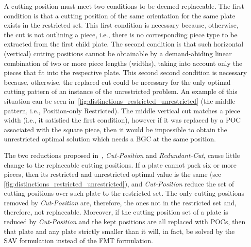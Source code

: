 \documentclass[ppgc,tese,english,formais,babel]{iiufrgs}
\begin{document}
A cutting position must meet two conditions to be deemed replaceable.
The first condition is that a cutting position of the same orientation for the same plate exists in the restricted set.
This first condition is necessary because, otherwise, the cut is not outlining a piece, i.e., there is no corresponding piece type to be extracted from the first child plate.
The second condition is that such horizontal (vertical) cutting positions cannot be obtainable by a demand-abiding linear combination of two or more piece lengths (widths), taking into account only the pieces that fit into the respective plate.
This second second condition is necessary because, otherwise, the replaced cut could be necessary for the only optimal cutting pattern of an instance of the unrestricted problem.
An example of this situation can be seen in~\cref{fig:distinctions_restricted_unrestricted} (the middle pattern, i.e., Position-only Restricted).
The middle vertical cut matches a piece width (i.e., it satisfied the first condition), however if it was replaced by a POC associated with the square piece, then it would be impossible to obtain the unrestricted optimal solution which needs a BGC at the same position.

The two reductions proposed in~\citet{furini:2016}, \emph{Cut-Position} and \emph{Redundant-Cut}, cause little change to the replaceable cutting positions.
If a plate cannot pack six or more pieces, then its restricted and unrestricted optimal value is the same (see \cref{fig:distinctions_restricted_unrestricted}), and \emph{Cut-Position} reduce the set of cutting positions over such plate to the restricted set.
The only cutting positions removed by \emph{Cut-Position} are, therefore, the ones not in the restricted set and, therefore, not replaceable.
Moreover, if the cutting position set of a plate is reduced by \emph{Cut-Position} and the kept positions are all replaced with POCs, then that plate and any plate strictly smaller than it will, in fact, be solved by the SAV formulation instead of the FMT formulation.
\end{document}
